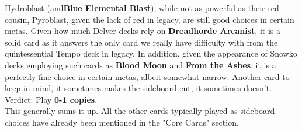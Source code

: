 \documentclass{report}
\begin{document}
Hydroblast (and\textbf{Blue Elemental Blast}), while not as powerful as their red cousin, Pyroblast, given the lack of red in legacy, are still good choices in certain metas. Given how much Delver decks rely on \textbf{Dreadhorde Arcanist}, it is a solid card as it answers the only card we really have difficulty with from the quintessential Tempo deck in legacy. In addition, given the appearance of Snowko decks employing such cards as \textbf{Blood Moon} and \textbf{From the Ashes}, it is a perfectly fine choice in certain metas, albeit somewhat narrow. Another card to keep in mind, it sometimes makes the sideboard cut, it sometimes doesn't.\\
Verdict: Play \textbf{0-1 copies}.\\
This generally sums it up. All the other cards typically played as sideboard choices have already been mentioned in the "Core Cards" section.\\
\end{document}
